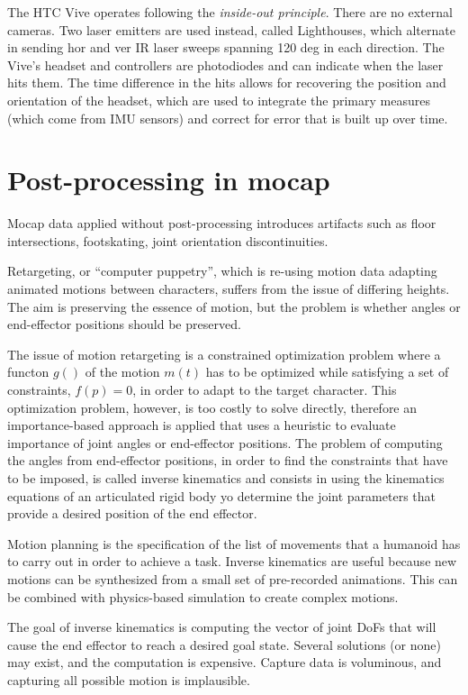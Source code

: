 \documentclass[a4paper]{article}
\begin{document}
The HTC Vive operates following the \emph{inside-out principle}.
There
are no external cameras.
Two laser emitters are used instead, called
Lighthouses, which alternate in sending hor and ver IR laser sweeps
spanning 120 deg in each direction.
The Vive's headset and controllers
are photodiodes and can indicate when the laser hits them.
The time
difference in the hits allows for recovering the position and
orientation of the headset, which are used to integrate the primary
measures (which come from IMU sensors) and correct for error that is
built up over time.

\section{Post-processing in mocap}

Mocap data applied without post-processing introduces artifacts such as
floor intersections, footskating, joint orientation discontinuities.

Retargeting, or ``computer puppetry'', which is re-using motion data
adapting animated motions between characters, suffers from the issue of
differing heights.
The aim is preserving the essence of motion, but the
problem is whether angles or end-effector positions should be preserved.

The issue of motion retargeting is a constrained optimization problem
where a functon \(g()\) of the motion \(m(t)\) has to be optimized while
satisfying a set of constraints, \(f(p) = 0\), in order to adapt to the
target character.
This optimization problem, however, is too costly to
solve directly, therefore an importance-based approach is applied that
uses a heuristic to evaluate importance of joint angles or end-effector
positions.
The problem of computing the angles from end-effector
positions, in order to find the constraints that have to be imposed, is
called inverse kinematics and consists in using the kinematics equations
of an articulated rigid body yo determine the joint parameters that
provide a desired position of the end effector.

Motion planning is the specification of the list of movements that a
humanoid has to carry out in order to achieve a task.
Inverse kinematics
are useful because new motions can be synthesized from a small set of
pre-recorded animations.
This can be combined with physics-based
simulation to create complex motions.

The goal of inverse kinematics is computing the vector of joint DoFs
that will cause the end effector to reach a desired goal state.
Several
solutions (or none) may exist, and the computation is expensive.
Capture
data is voluminous, and capturing all possible motion is implausible.
\end{document}
